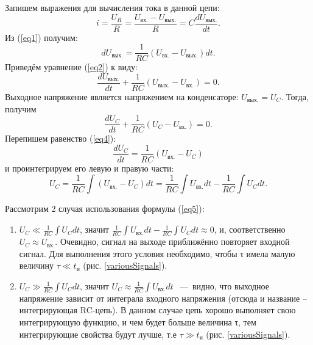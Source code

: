 \documentclass[14pt,a4paper]{article}
\begin{document}
Запишем выражения для вычисления тока в данной цепи:
\begin{equation} \label{eq1}
  i = \frac{U_{R}}{R} = \frac{U_\text{вх.} - U_\text{вых.}}{R} = C\frac{dU_\text{вых.}}{dt}.
\end{equation}
Из (\ref{eq1}) получим:
\begin{equation} \label{eq2}
  dU_\text{вых.} = \frac{1}{RC}\left( U_\text{вх.} - U_\text{вых.} \right)dt. 
\end{equation}
Приведём уравнение (\ref{eq2}) к виду:
\begin{equation}
  \frac{dU_\text{вых.}}{dt} + \frac{1}{RC}\left( U_\text{вых.} - U_\text{вх.} \right) = 0.
\end{equation}
Выходное напряжение является напряжением на конденсаторе: \(U_\text{вых.} = U_{C}.\) Тогда, получим
\begin{equation} \label{eq4}
  \frac{{dU}_{C}}{dt} + \frac{1}{RC}\left( U_{C} - U_\text{вх.} \right) = 0.
\end{equation}
Перепишем равенство (\ref{eq4}):
\begin{equation*}
\frac{{dU}_{C}}{dt} = \frac{1}{RC}\left( U_\text{вх.} - U_{C} \right)
\end{equation*}
и проинтегрируем его левую и правую части:
\begin{equation} \label{eq5}
  U_{C} = \frac{1}{RC}\int \left( U_\text{вх.} - U_{C} \right)dt = \frac{1}{RC}\int U_\text{вх.}dt - \frac{1}{RC}\int U_{C}dt.
\end{equation}

Рассмотрим 2 случая использования формулы (\ref{eq5}):
\begin{enumerate}
  \item \(U_{C} \ll \frac{1}{RC}\int U_{C}dt\), значит  \(\frac{1}{RC}\int U_\text{вх.}dt - \frac{1}{RC}\int U_{C}dt \approx 0\),
  и, соответственно \(U_{C} \approx U_\text{вх.}.\) Очевидно, сигнал на выходе
  приближённо повторяет входной сигнал. Для выполнения этого условия
  необходимо, чтобы τ имела малую величину \(\tau \ll t_\text{и}\) (рис. \ref{variousSignals}).
  \item \(U_{C} \gg \frac{1}{RC}\int U_{C}dt\), значит \(U_{C} \approx \frac{1}{RC}\int U_\text{вх.}dt\ \)~---~видно, что
  выходное напряжение зависит от интеграла входного напряжения (отсюда и
  название -- интегрирующая RC-цепь). В данном случае цепь хорошо выполняет свою интегрирующую функцию, и чем   будет больше величина τ, тем интегрирующие свойства будут лучше, т.е
  \(\tau \gg t_\text{и}\) (рис. \ref{variousSignals}).
\end{enumerate}
\end{document}
